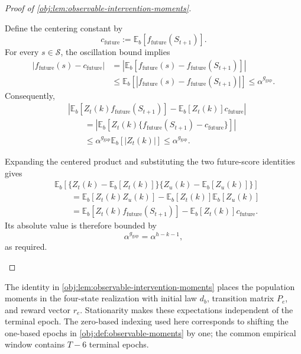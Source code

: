 \documentclass[11pt]{article}
\begin{document}
\begin{proof}[Proof of \cref{obj:lem:observable-intervention-moments}]
\begin{enumerate}
Define the centering constant by
\[
c_{\mathrm{future}}
:=
\mathbb E_b[f_{\mathrm{future}}(S_{t+1})].
\]
For every \(s\in\mathcal S\), the oscillation bound implies
\[
\begin{aligned}
|f_{\mathrm{future}}(s)-c_{\mathrm{future}}|
&=
\left|\mathbb E_b[
f_{\mathrm{future}}(s)-f_{\mathrm{future}}(S_{t+1})]\right|\\
&\le
\mathbb E_b\!\left[
|f_{\mathrm{future}}(s)-f_{\mathrm{future}}(S_{t+1})|
\right]
\le\alpha^{g_{\mathrm{gap}}}.
\end{aligned}
\]
Consequently,
\[
\begin{aligned}
&\left|
\mathbb E_b[Z_t(k)f_{\mathrm{future}}(S_{t+1})]
-\mathbb E_b[Z_t(k)]c_{\mathrm{future}}
\right|\\
&\qquad=
\left|\mathbb E_b\!\left[
Z_t(k)\{f_{\mathrm{future}}(S_{t+1})-c_{\mathrm{future}}\}
\right]\right|\\
&\qquad\le
\alpha^{g_{\mathrm{gap}}}\mathbb E_b[|Z_t(k)|]
\le\alpha^{g_{\mathrm{gap}}}.
\end{aligned}
\]

Expanding the centered product and substituting the two future-score identities gives
\[
\begin{aligned}
&\mathbb E_b\!\left[
\{Z_t(k)-\mathbb E_b[Z_t(k)]\}
\{Z_u(k)-\mathbb E_b[Z_u(k)]\}
\right]\\
&\qquad=
\mathbb E_b[Z_t(k)Z_u(k)]
-\mathbb E_b[Z_t(k)]\mathbb E_b[Z_u(k)]\\
&\qquad=
\mathbb E_b[Z_t(k)f_{\mathrm{future}}(S_{t+1})]
-\mathbb E_b[Z_t(k)]c_{\mathrm{future}}.
\end{aligned}
\]
Its absolute value is therefore bounded by
\[
\alpha^{g_{\mathrm{gap}}}=\alpha^{h-k-1},
\]
as required.
\end{enumerate}
\end{proof}

The identity in \cref{obj:lem:observable-intervention-moments} places the population moments in the four-state realization with initial law \(d_b\), transition matrix \(P_e\), and reward vector \(r_e\). Stationarity makes these expectations independent of the terminal epoch. The zero-based indexing used here corresponds to shifting the one-based epochs in \cref{obj:def:observable-moments} by one; the common empirical window contains \(T-6\) terminal epochs.
\end{document}
